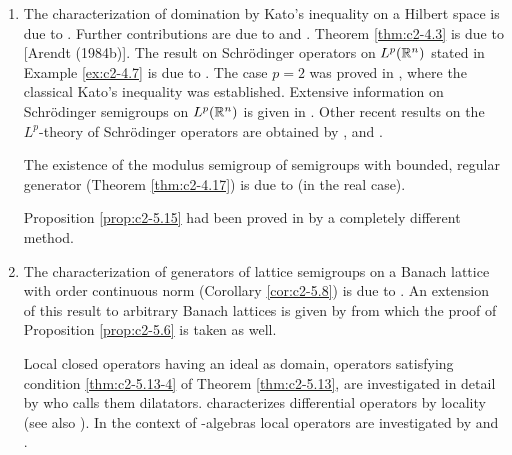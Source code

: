 \begin{enumerate}[label=\emph{Section \arabic*:}, wide]
\item  The characterization of domination by Kato's inequality on a Hilbert space is due to \citet{simon:1977}. Further contributions are due to \citet{hessetal:1977} and \citet{kishimotorobinson:1980}. Theorem \ref{thm:c2-4.3} is due to [Arendt (1984b)]. The result on Schrödinger operators on $L^p(\mathbb{R}^n)$ stated in Example \ref{ex:c2-4.7} is due to \citet{kato:1986}. The case $p = 2$ was proved in \citet{kato:1973}, where the classical Kato's inequality was established. Extensive information on Schrödinger semigroups on $L^p(\mathbb{R}^n)$ is given in \citet{simon:1982}. Other recent results on the $L^p$-theory of Schrödinger operators are obtained by \citet{davies:1986}, \citet{okazawa:1984} and \citet{voigt:1984a}.

The existence of the modulus semigroup of semigroups with bounded, regular generator (Theorem \ref{thm:c2-4.17}) is due to \citet{derndinger:1984} (in the real case).

Proposition \ref{prop:c2-5.15}   had been proved in \citet{schaeferetal:1978} by a completely different method.
 
\item  
The characterization of generators of lattice semigroups on a Banach lattice with order continuous norm (Corollary  \ref{cor:c2-5.8}) is due to \citet{nageluhlig:1981}. An extension of this result to arbitrary Banach lattices is given by \citet{arendt:1982} from which the proof of  Proposition  \ref{prop:c2-5.6}   is taken as well.

Local closed operators having an ideal as domain, \ie operators satisfying condition \ref{thm:c2-5.13-4} of Theorem \ref{thm:c2-5.13}, are investigated in detail by \citet{nakano:1950} who calls them dilatators. \citet{peetre:1959} characterizes differential operators by locality (see also \citet{luxemburg:1979}). In the context of \CA-algebras local operators are investigated by \citet{battyrobinson:1984} and \citet{battyrobinson:1985}.

\end{enumerate}

{\RaggedRight

}
